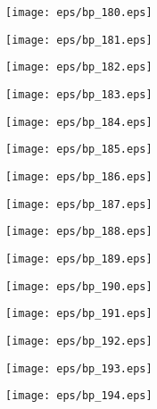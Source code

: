 \documentclass{book}
\begin{document}
	\clearpage\begin{figure}[p]
    \centering
	\texttt{[image: eps/bp\_180.eps]}
	\end{figure}
	\clearpage\begin{figure}[p]
    \centering
	\texttt{[image: eps/bp\_181.eps]}
	\end{figure}
	\clearpage\begin{figure}[p]
    \centering
	\texttt{[image: eps/bp\_182.eps]}
	\end{figure}
	\clearpage\begin{figure}[p]
    \centering
	\texttt{[image: eps/bp\_183.eps]}
	\end{figure}
	\clearpage\begin{figure}[p]
    \centering
	\texttt{[image: eps/bp\_184.eps]}
	\end{figure}
	\clearpage\begin{figure}[p]
    \centering
	\texttt{[image: eps/bp\_185.eps]}
	\end{figure}
	\clearpage\begin{figure}[p]
    \centering
	\texttt{[image: eps/bp\_186.eps]}
	\end{figure}
	\clearpage\begin{figure}[p]
    \centering
	\texttt{[image: eps/bp\_187.eps]}
	\end{figure}
	\clearpage\begin{figure}[p]
    \centering
	\texttt{[image: eps/bp\_188.eps]}
	\end{figure}
	\clearpage\begin{figure}[p]
    \centering
	\texttt{[image: eps/bp\_189.eps]}
	\end{figure}
	\clearpage\begin{figure}[p]
    \centering
	\texttt{[image: eps/bp\_190.eps]}
	\end{figure}
	\clearpage\begin{figure}[p]
    \centering
	\texttt{[image: eps/bp\_191.eps]}
	\end{figure}
	\clearpage\begin{figure}[p]
    \centering
	\texttt{[image: eps/bp\_192.eps]}
	\end{figure}
	\clearpage\begin{figure}[p]
    \centering
	\texttt{[image: eps/bp\_193.eps]}
	\end{figure}
	\clearpage\begin{figure}[p]
    \centering
	\texttt{[image: eps/bp\_194.eps]}
	\end{figure}
\end{document}
